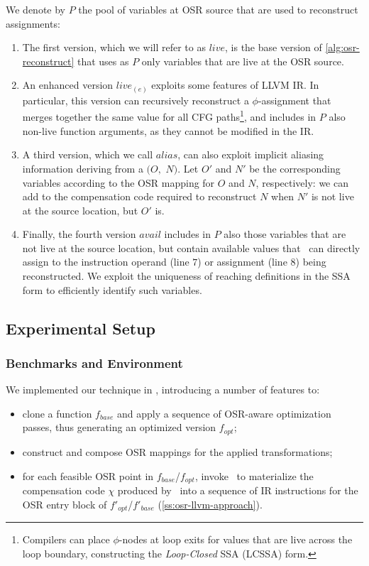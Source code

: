 We denote by $P$ the pool of variables at OSR source that are used to reconstruct assignments:
\begin{enumerate}
 \item The first version, which we will refer to as $live$, is the base version of \myalgorithm\ref{alg:osr-reconstruct} that uses as $P$ only variables that are live at the OSR source.
 \item An enhanced version $live_{(e)}$ exploits some features of LLVM IR. In particular, this version can recursively reconstruct a $\phi$-assignment that merges together the same value for all CFG paths\footnote{Compilers can place $\phi$-nodes at loop exits for values that are live across the loop boundary, constructing the {\em Loop-Closed} SSA (LCSSA) form.}, and includes in $P$ also non-live function arguments, as they cannot be modified in the IR.
 \item A third version, which we call $alias$, can also exploit implicit aliasing information deriving from a \RAUW$(O,$ $N)$. Let $O'$ and $N'$ be the corresponding variables according to the OSR mapping for $O$ and $N$, respectively: we can add  to the compensation code required to reconstruct $N$ when $N'$ is not live at the source location, but $O'$ is.
 \item Finally, the fourth version $avail$ includes in $P$ also those variables that are not live at the source location, but contain available values that \reconstruct\ can directly assign to the instruction operand (line $7$) or assignment (line $8$) being reconstructed. We exploit the uniqueness of reaching definitions in the SSA form to efficiently identify such variables.
\end{enumerate}

\subsection{Experimental Setup}

\subsubsection*{Benchmarks and Environment}
We implemented our technique in \tinyvm, introducing a number of features to:
\begin{itemize}
 \item clone a function $f_{base}$ and apply a sequence of OSR-aware optimization passes, thus generating an optimized version $f_{opt}$;
 \item construct and compose OSR mappings for the applied transformations;
 \item for each feasible OSR point in $f_{base}$/$f_{opt}$, invoke \osrkit\ to materialize the compensation code $\chi$ produced by \reconstruct\ into a sequence of IR instructions for the OSR entry block of $f'_{opt}$/$f'_{base}$ (\mysection\ref{ss:osr-llvm-approach}).
\end{itemize}

